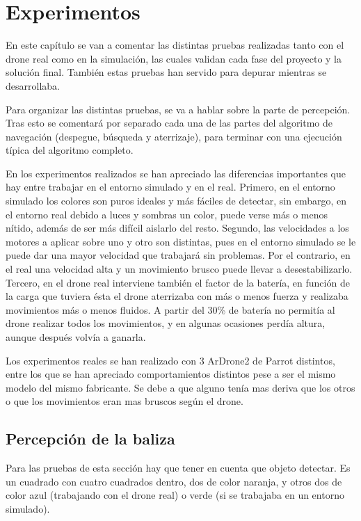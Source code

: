 \chapter{Experimentos}\label{cap.experimentos}
\hspace{1cm} En este cap\'itulo se van a comentar las distintas pruebas realizadas tanto con el drone real como en la simulaci\'on, las cuales validan cada fase del proyecto y la soluci\'on final. Tambi\'en estas pruebas han servido para depurar mientras se desarrollaba. 

\hspace{1cm} Para organizar las distintas pruebas, se va a hablar sobre la parte de percepci\'on. Tras esto se comentar\'a por separado cada una de las partes del algoritmo de navegaci\'on (despegue, b\'usqueda y aterrizaje), para terminar con una ejecuci\'on t\'ipica del algoritmo completo.

\hspace{1cm} En los experimentos realizados se han apreciado las diferencias importantes que hay entre trabajar en el entorno simulado y en el real. Primero, en el entorno simulado los colores son puros ideales y m\'as f\'aciles de detectar, sin embargo, en el entorno real debido a luces y sombras un color, puede verse m\'as o menos n\'itido, adem\'as de ser m\'as dif\'icil aislarlo del resto. Segundo, las velocidades a los motores a aplicar sobre uno y otro son distintas, pues en el entorno simulado se le puede dar una mayor velocidad que trabajar\'a sin problemas. Por el contrario, en el real una velocidad alta y un movimiento brusco puede llevar a desestabilizarlo. Tercero, en el drone real interviene tambi\'en el factor de la bater\'ia, en funci\'on de la carga que tuviera \'esta el drone aterrizaba con m\'as o menos fuerza y realizaba movimientos m\'as o menos fluidos. A partir del 30\% de bater\'ia no permit\'ia al drone realizar todos los movimientos, y en algunas ocasiones perd\'ia altura, aunque despu\'es volv\'ia a ganarla. 

\hspace{1cm} Los experimentos reales se han realizado con 3 ArDrone2 de Parrot distintos, entre los que se han apreciado comportamientos distintos pese a ser el mismo modelo del mismo fabricante. Se debe a que alguno ten\'ia mas deriva que los otros o que los movimientos eran mas bruscos seg\'un el drone.


\section{Percepci\'on de la baliza}\label{sec:percepcion}
\hspace{1cm} Para las pruebas de esta secci\'on hay que tener en cuenta que objeto detectar. Es un cuadrado con cuatro cuadrados dentro, dos de color naranja, y otros dos de color azul (trabajando con el drone real) o verde (si se trabajaba en un entorno simulado). 

